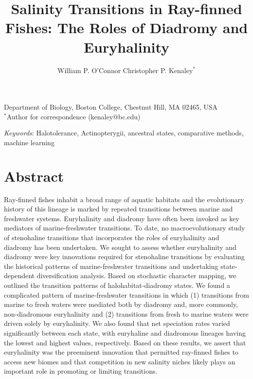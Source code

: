 \documentclass[11pt]{article}
\title{Salinity Transitions in Ray-finned Fishes: The Roles of Diadromy and Euryhalinity}
\author{
William P. O'Connor
Christopher P. Kenaley$^*$
}
\date{}
\begin{document}
\maketitle

\noindent Department of Biology, Boston College, Chestnut Hill, MA 02465, USA\\ 
$^{*}$Author for correspondence (kenaley@bc.edu)\\

\bigskip

 
\bigskip

\textit{Keywords}: Halotolerance, Actinopterygii, ancestral states, comparative methods, machine learning

\bigskip


\newpage{}

\section*{Abstract}

Ray-finned fishes inhabit a broad range of aquatic habitats and the evolutionary history of this lineage is marked by repeated transitions between marine and freshwater systems. Euryhalinity and diadromy have often been invoked as key mediators of marine-freshwater transitions. To date, no macroevolutionary study of stenohaline transitions that incorporates the roles of euryhalinity and diadromy has been undertaken. We sought to assess whether euryhalinity and diadromy were key innovations required for stenohaline transitions by evaluating the historical patterns of marine-freshwater transitions and undertaking state-dependent diversification analysis. Based on stochastic character mapping, we outlined the transition patterns of halohabitat-diadromy states. We found a complicated pattern of marine-freshwater transitions in which (1) transitions from marine to fresh waters were mediated both by diadromy and, more commonly, non-diadromous euryhalinity and (2) transitions from fresh to marine waters were driven solely by euryhalinity. We also found that net speciation rates varied significantly between each state, with euryhaline and diadromous lineages having the lowest and highest values, respectively. Based on these results, we assert that euryhalinity was the preeminent innovation that permitted ray-finned fishes to access new biomes and that competition in new salinity niches likely plays an important role in promoting or limiting transitions.
\end{document}
